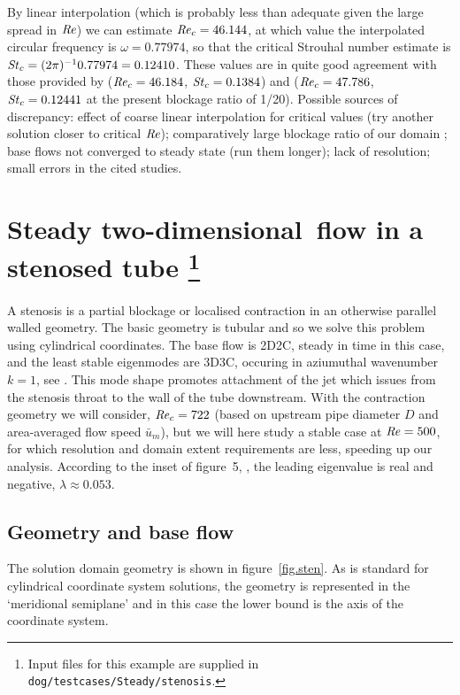 \documentclass[11pt,a4paper]{report}
\newcommand\Rey{\mbox{\textit{Re}}}
\newcommand\Str{\mbox{\textit{St}}}
\newcommand\twod{two-di\-men\-sion\-al}
\begin{document}
By linear interpolation (which is probably less than adequate given
the large spread in $\Rey$) we can estimate $\Rey_c=46.144$, at which
value the interpolated circular frequency is $\omega=0.77974$, so that
the critical Strouhal number estimate is
$\Str_c=(2\pi)^{-1}0.77974=0.12410$.  These values are in quite good
agreement with those provided by \citet{jack87} ($\Rey_c=46.184$,
$\Str_c=0.1384$) and \citet{kumi06} ($\Rey_c=47.786$, $\Str_c=0.12441$
at the present blockage ratio of 1/20).  Possible sources of
discrepancy: effect of coarse linear interpolation for critical values
(try another solution closer to critical $\Rey$); comparatively large
blockage ratio of our domain \citep[see][regarding
  sensitivity]{kumi06}; base flows not converged to steady state (run
them longer); lack of resolution; small errors in the cited studies.

\section{Steady \twod\ flow in a stenosed tube
\protect\footnote{Input files for this example are supplied in
  \texttt{dog/testcases/Steady/stenosis}.}  }
\label{sec.sten3D}

A stenosis is a partial blockage or localised contraction in an
otherwise parallel walled geometry.  The basic geometry is tubular and
so we solve this problem using cylindrical coordinates.  The base flow
is 2D2C, steady in time in this case, and the least stable eigenmodes
are 3D3C, occuring in aziumuthal wavenumber $k=1$, see
\citet{shbl05}. This mode shape promotes attachment of the jet which
issues from the stenosis throat to the wall of the tube
downstream. With the contraction geometry we will consider,
$\Rey_c=722$ (based on upstream pipe diameter $D$ and area-averaged
flow speed $\bar{u}_m$), but we will here study a stable case at
$\Rey=500$, for which resolution and domain extent requirements are
less, speeding up our analysis.  According to the inset of figure~5,
\citet{shbl05}, the leading eigenvalue is real and negative,
$\lambda\approx0.053$.

\subsection{Geometry and base flow}

The solution domain geometry is shown in figure~\ref{fig.sten}.  As is
standard for cylindrical coordinate system solutions, the geometry is
represented in the `meridional semiplane' and in this case the lower
bound is the axis of the coordinate system.
\end{document}
